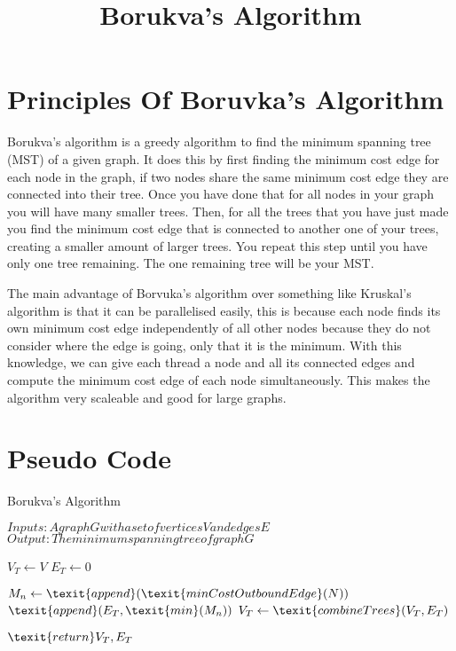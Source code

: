 \documentclass{report}
\title{Borukva's Algorithm}
\author{}
\begin{document}
\maketitle

\section{Principles Of Boruvka's Algorithm}
Borukva's algorithm is a greedy algorithm to find the minimum spanning tree (MST) of a given graph.
It does this by first finding the minimum cost edge for each node in the graph, if two nodes share the same minimum cost edge they are connected into their tree.
Once you have done that for all nodes in your graph you will have many smaller trees.
Then, for all the trees that you have just made you find the minimum cost edge that is connected to another one of your trees, creating a smaller amount of larger trees.
You repeat this step until you have only one tree remaining.
The one remaining tree will be your MST.

The main advantage of Borvuka's algorithm over something like Kruskal's algorithm is that it can be parallelised easily, this is because each node finds its own minimum cost edge independently of all other nodes because they do not consider where the edge is going, only that it is the minimum.
With this knowledge, we can give each thread a node and all its connected edges and compute the minimum cost edge of each node simultaneously.
This makes the algorithm very scaleable and good for large graphs.

\section{Pseudo Code}

\caption{Borukva's Algorithm}

\begin{algorithmic}
    \State $ Inputs: A graph G with a set of vertices V and edges E $
    \State $ Output: The minimum spanning tree of graph G $

    \State $ V_{T} \gets V $
    \State $ E_{T} \gets 0 $

                \State $ M_{n} \gets \texit{append}(\texit{minCostOutboundEdge}(N)) $
            \EndFor
            \State $ \texit{append}(E_{T}, \texit{min}(M_{n})) $
        \State $ V_{T} \gets \texit{combineTrees}(V_{T}, E_{T}) $
        \EndFor
    \EndWhile

    \State $ \texit{return} V_{T}, E_{T} $
\end{algorithmic}
\end{document}
